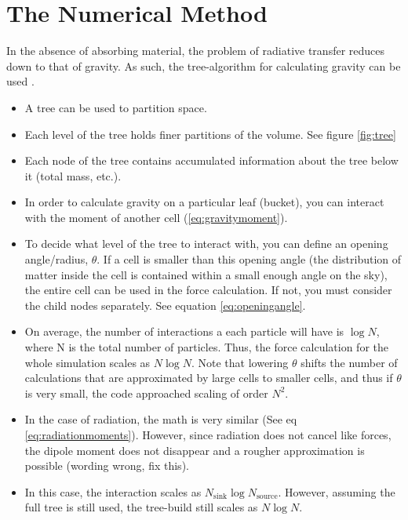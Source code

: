 \pagestyle{fancy}
\headheight 20pt
\chead{}
\lfoot{}
\cfoot{\thepage}
\rfoot{}
\renewcommand{\headrulewidth}{0.1pt}
\renewcommand{\footrulewidth}{0.1pt}

\chapter{The Numerical Method}
\label{chap:method}
\thispagestyle{fancy}

In the absence of absorbing material, the problem of radiative transfer reduces down to that of gravity. As such, the tree-algorithm for calculating gravity can be used \citep{barnesHut86}.

\begin{itemize}
\item A tree can be used to partition space.
\item Each level of the tree holds finer partitions of the volume. See figure \ref{fig:tree}
\item Each node of the tree contains accumulated information about the tree below it (total mass, etc.).
\item In order to calculate gravity on a particular leaf (bucket), you can interact with the moment of another cell (\ref{eq:gravitymoment}).
\item To decide what level of the tree to interact with, you can define an opening angle/radius, $\theta$. If a cell is smaller than this opening angle (the distribution of matter inside the cell is contained within a small enough angle on the sky), the entire cell can be used in the force calculation. If not, you must consider the child nodes separately. See equation \ref{eq:openingangle}.
\item On average, the number of interactions a each particle will have is $\log{N}$, where N is the total number of particles. Thus, the force calculation for the whole simulation scales as $N\log{N}$. Note that lowering $\theta$ shifts the number of calculations that are approximated by large cells to smaller cells, and thus if $\theta$ is very small, the code approached scaling of order $N^2$.
\item In the case of radiation, the math is very similar (See eq \ref{eq:radiationmoments}). However, since radiation does not cancel like forces, the dipole moment does not disappear and a rougher approximation is possible (wording wrong, fix this).
\item In this case, the interaction scales as $N_{\mbox{sink}}\log{N_{\mbox{source}}}$. However, assuming the full tree is still used, the tree-build still scales as $N\log{N}$.
\end{itemize}

